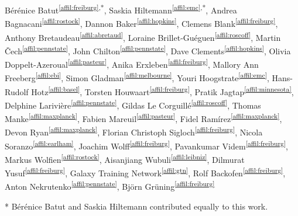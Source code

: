 \setcounter{NAT@ctr}{-1}

Bérénice Batut\textsuperscript{\ref{affil:freiburg},*},
Saskia Hiltemann\textsuperscript{\ref{affil:emc},*},
Andrea Bagnacani\textsuperscript{\ref{affil:rostock}},
Dannon Baker\textsuperscript{\ref{affil:hopkins}},
Clemens Blank\textsuperscript{\ref{affil:freiburg}},
Anthony Bretaudeau\textsuperscript{\ref{affil:abretaud}},
Loraine Brillet-Guéguen\textsuperscript{\ref{affil:roscoff}},
Martin Čech\textsuperscript{\ref{affil:pennstate}},
John Chilton\textsuperscript{\ref{affil:pennstate}},
Dave Clements\textsuperscript{\ref{affil:hopkins}},
Olivia Doppelt-Azeroual\textsuperscript{\ref{affil:pasteur}},
Anika Erxleben\textsuperscript{\ref{affil:freiburg}},
Mallory Ann Freeberg\textsuperscript{\ref{affil:ebi}},
Simon Gladman\textsuperscript{\ref{affil:melbourne}},
Youri Hoogstrate\textsuperscript{\ref{affil:emc}},
Hans-Rudolf Hotz\textsuperscript{\ref{affil:basel}},
Torsten Houwaart\textsuperscript{\ref{affil:freiburg}},
Pratik Jagtap\textsuperscript{\ref{affil:minnesota}},
Delphine Larivière\textsuperscript{\ref{affil:pennstate}},
Gildas Le Corguillé\textsuperscript{\ref{affil:roscoff}},
Thomas Manke\textsuperscript{\ref{affil:maxplanck}},
Fabien Mareuil\textsuperscript{\ref{affil:pasteur}},
Fidel Ramírez\textsuperscript{\ref{affil:maxplanck}},
Devon Ryan\textsuperscript{\ref{affil:maxplanck}},
Florian Christoph Sigloch\textsuperscript{\ref{affil:freiburg}},
Nicola Soranzo\textsuperscript{\ref{affil:earlham}},
Joachim Wolff\textsuperscript{\ref{affil:freiburg}},
Pavankumar Videm\textsuperscript{\ref{affil:freiburg}},
Markus Wolfien\textsuperscript{\ref{affil:rostock}},
Aisanjiang Wubuli\textsuperscript{\ref{affil:leibniz}},
Dilmurat Yusuf\textsuperscript{\ref{affil:freiburg}},
Galaxy Training Network\textsuperscript{\ref{affil:gtn}},
Rolf Backofen\textsuperscript{\ref{affil:freiburg}},
Anton Nekrutenko\textsuperscript{\ref{affil:pennstate}},
Björn Grüning\textsuperscript{\ref{affil:freiburg}}

* Bérénice Batut and Saskia Hiltemann contributed equally to this work.

